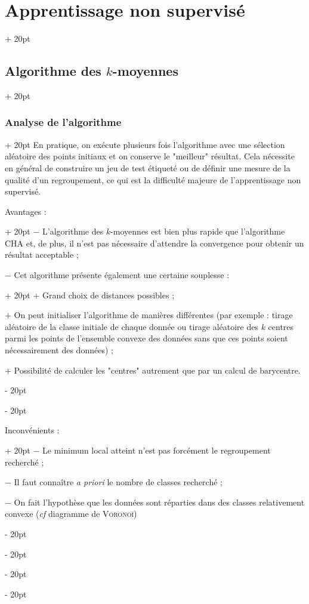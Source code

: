 \documentclass[a4paper, 12pt, twoside]{article}
\newcommand{\ind}[1][20pt]{\advance\leftskip + #1}
\newcommand{\deind}[1][20pt]{\advance\leftskip - #1}
\newenvironment{indt}[2][20pt]{#2 \par \ind[#1]}{\par \deind} %
\begin{document}
\begin{indt}{\section{Apprentissage non supervisé}}
\begin{indt}{\subsection{Algorithme des $k$-moyennes}}
\begin{indt}{\subsubsection{Analyse de l'algorithme}}
                En pratique, on exécute plusieurs fois l'algorithme avec une sélection aléatoire des points initiaux et on conserve le "meilleur" résultat.
                Cela nécessite en général de construire un jeu de test étiqueté ou de définir une mesure de la qualité d'un regroupement, ce qui est la difficulté majeure de l'apprentissage non supervisé.

                \vspace{12pt}
                
                \begin{indt}{Avantages :}
                    $-$ L'algorithme des $k$-moyennes est bien plus rapide que l'algorithme CHA et, de plus, il n'est pas nécessaire d'attendre la convergence pour obtenir un résultat acceptable ;

                    \begin{indt}{$-$ Cet algorithme présente également une certaine souplesse :}
                        $+$ Grand choix de distances possibles ;

                        $+$ On peut initialiser l'algorithme de manières différentes (par exemple : tirage aléatoire de la classe initiale de chaque donnée ou tirage aléatoire des $k$ centres parmi les points de l'ensemble convexe des données sans que ces points soient nécessairement des données) ;

                        $+$ Possibilité de calculer les "centres" autrement que par un calcul de barycentre.
                    \end{indt}
                \end{indt}

                \vspace{12pt}
                
                \begin{indt}{Inconvénients :}
                    $-$ Le minimum local atteint n'est pas forcément le regroupement recherché ;

                    $-$ Il faut connaître \textit{a priori} le nombre de classes recherché ;

                    $-$ On fait l'hypothèse que les données sont réparties dans des classes relativement convexe (\textit{cf} diagramme de \textsc{Voronoï})
                \end{indt}
            \end{indt}
        \end{indt}
    \end{indt}
\end{document}
